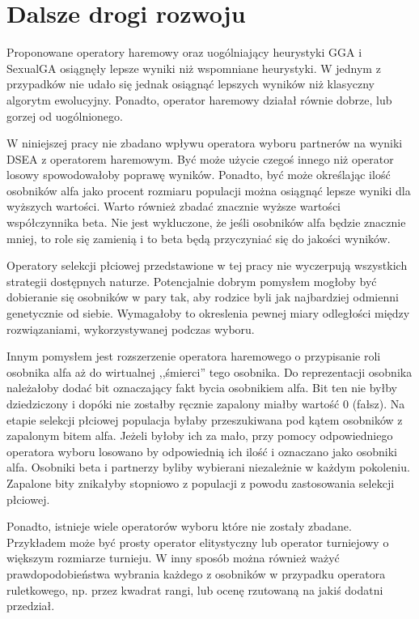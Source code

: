 \documentclass[./FM_mgr.tex]{subfiles}
\begin{document}
\chapter{Dalsze drogi rozwoju}

Proponowane operatory haremowy oraz uogólniający heurystyki GGA i SexualGA osiągnęły lepsze wyniki niż wspomniane heurystyki.
W jednym z przypadków nie udało się jednak osiągnąć lepszych wyników niż klasyczny algorytm ewolucyjny.
Ponadto, operator haremowy działał równie dobrze, lub gorzej od uogólnionego.

W niniejszej pracy nie zbadano wpływu operatora wyboru partnerów na wyniki DSEA z operatorem haremowym.
Być może użycie czegoś innego niż operator losowy spowodowałoby poprawę wyników.
Ponadto, być może określając ilość osobników alfa jako procent rozmiaru populacji można osiągnąć lepsze wyniki dla wyższych wartości.
Warto również zbadać znacznie wyższe wartości współczynnika beta.
Nie jest wykluczone, że jeśli osobników alfa będzie znacznie mniej, to role się zamienią i to beta będą przyczyniać się do jakości wyników.

Operatory selekcji płciowej przedstawione w tej pracy nie wyczerpują wszystkich strategii dostępnych naturze.
Potencjalnie dobrym pomysłem mogłoby być dobieranie się osobników w pary tak, aby rodzice byli jak najbardziej odmienni genetycznie od siebie.
Wymagałoby to okreslenia pewnej miary odległości między rozwiązaniami, wykorzystywanej podczas wyboru.

Innym pomysłem jest rozszerzenie operatora haremowego o przypisanie roli osobnika alfa aż do wirtualnej ,,śmierci'' tego osobnika.
Do reprezentacji osobnika należałoby dodać bit oznaczający fakt bycia osobnikiem alfa.
Bit ten nie byłby dziedziczony i dopóki nie zostałby ręcznie zapalony miałby wartość 0 (fałsz).
Na etapie selekcji płciowej populacja byłaby przeszukiwana pod kątem osobników z zapalonym bitem alfa.
Jeżeli byłoby ich za mało, przy pomocy odpowiedniego operatora wyboru losowano by odpowiednią ich ilość i oznaczano jako osobniki alfa.
Osobniki beta i partnerzy byliby wybierani niezależnie w każdym pokoleniu.
Zapalone bity znikałyby stopniowo z populacji z powodu zastosowania selekcji płciowej.

Ponadto, istnieje wiele operatorów wyboru które nie zostały zbadane.
Przykładem może być prosty operator elitystyczny lub operator turniejowy o większym rozmiarze turnieju.
W inny sposób można również ważyć prawdopodobieństwa wybrania każdego z osobników w przypadku operatora ruletkowego, np. przez kwadrat rangi, lub ocenę rzutowaną na jakiś dodatni przedział.
\end{document}
